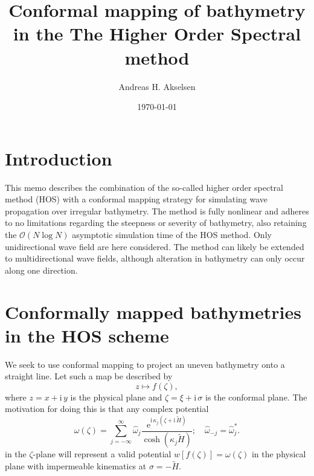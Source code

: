 \documentclass[internal]{sintefmemo}
\title{Conformal mapping of bathymetry in the The Higher Order Spectral method}
\author{Andreas H. Akselsen}
\date{\today}
\newcommand{\mr}{\mathrm}
\newcommand{\ii}{\mr{i}\,}
\newcommand{\ee}{\mr{e}}
\renewcommand{\_}[1]{_\mr{#1}}
\newcommand{\w}{w}
\newcommand{\h}{\hat}
\newcommand{\z}{z}
\newcommand{\x}{x}
\newcommand{\y}{y}
\newcommand{\zz}{\zeta}
\newcommand{\xx}{\xi}
\newcommand{\yy}{\sigma}
\newcommand{\kk}{\kappa}
\newcommand{\zmap}{f}
\newcommand{\ww}{\omega}
\renewcommand{\w}{w}
\begin{document}
\frontmatter


\section{Introduction}
This memo describes the combination of the so-called higher order spectral method (HOS) with a conformal mapping strategy for simulating wave propagation over irregular bathymetry.
The method is fully nonlinear and adheres to no limitations regarding the steepness or severity of bathymetry, also retaining the $\mathcal O(N\log N)$ asymptotic simulation time of the HOS method. 
Only unidirectional wave field are here considered. The method can likely be extended to multidirectional wave fields, although alteration in bathymetry can only occur along one direction.


\section{Conformally mapped bathymetries in the HOS scheme}
We seek to use conformal mapping to project an uneven bathymetry onto a straight line.
Let such a map be described by 
\begin{equation*}
	\z \mapsto \zmap(\zz),
\end{equation*}
where $\z = \x+\ii\y$ is the physical plane and $\zz=\xx+\ii\yy$ is the conformal plane. 
The motivation for doing this is that any complex potential 
\begin{equation}
\ww(\zz) = \sum_{j=-\infty}^\infty \h\ww_j \frac{\ee^{\ii \kk_j(\zz+\ii\tilde H)}}{\cosh(\kk_j \tilde H)}; \quad \h\ww_{-j}=\h\ww_{j}^*.
\label{eq:ww}
\end{equation}
in the $\zz$-plane will represent a valid potential $\w[\zmap(\zz)]=\ww(\zz)$ in the physical plane with impermeable kinematics at $\yy=-\tilde H$.
\\
\end{document}
